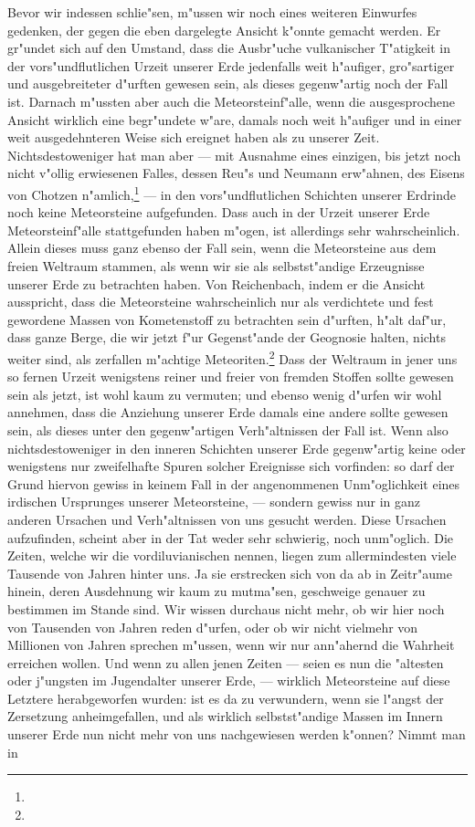 \documentclass[a4paper, 8pt, oneside, polutonikogreek, german]{article}
\begin{document}
Bevor wir indessen schlie"sen, m"ussen wir noch eines weiteren Einwurfes gedenken, der gegen die eben dargelegte Ansicht k"onnte gemacht werden. Er gr"undet sich auf den Umstand, dass die Ausbr"uche vulkanischer T"atigkeit in der vors"undflutlichen Urzeit unserer Erde jedenfalls weit h"aufiger, gro"sartiger und ausgebreiteter d"urften gewesen sein, als dieses gegenw"artig noch der Fall ist. Darnach m"ussten aber auch die Meteorsteinf"alle, wenn die ausgesprochene Ansicht wirklich eine begr"undete w"are, damals noch weit h"aufiger und in einer weit ausgedehnteren Weise sich ereignet haben als zu unserer Zeit. Nichtsdestoweniger hat man aber --- mit Ausnahme eines einzigen, bis jetzt noch nicht v"ollig erwiesenen Falles, dessen Reu"s und Neumann erw"ahnen, des Eisens von Chotzen n"amlich,\footnote{} --- in den vors"undflutlichen Schichten unserer Erdrinde noch keine Meteorsteine aufgefunden. Dass auch in der Urzeit unserer Erde Meteorsteinf"alle stattgefunden haben m"ogen, ist allerdings sehr wahrscheinlich. Allein dieses muss ganz ebenso der Fall sein, wenn die Meteorsteine aus dem freien Weltraum stammen, als wenn wir sie als selbstst"andige Erzeugnisse unserer Erde zu betrachten haben. Von Reichenbach, indem er die Ansicht ausspricht, dass die Meteorsteine wahrscheinlich nur als verdichtete und fest gewordene Massen von Kometenstoff zu betrachten sein d"urften, h"alt daf"ur, dass ganze Berge, die wir jetzt f"ur Gegenst"ande der Geognosie halten, nichts weiter sind, als zerfallen m"achtige Meteoriten.\footnote{} Dass der Weltraum in jener uns so fernen Urzeit wenigstens reiner und freier von fremden Stoffen sollte gewesen sein als jetzt, ist wohl kaum zu vermuten; und ebenso wenig d"urfen wir wohl annehmen, dass die Anziehung unserer Erde damals eine andere sollte gewesen sein, als dieses unter den gegenw"artigen Verh"altnissen der Fall ist. Wenn also nichtsdestoweniger in den inneren Schichten unserer Erde gegenw"artig keine oder wenigstens nur zweifelhafte Spuren solcher Ereignisse sich vorfinden: so darf der Grund hiervon gewiss in keinem Fall in der angenommenen Unm"oglichkeit eines irdischen Ursprunges unserer Meteorsteine, --- sondern gewiss nur in ganz anderen Ursachen und Verh"altnissen von uns gesucht werden. Diese Ursachen aufzufinden, scheint aber in der Tat weder sehr schwierig, noch unm"oglich. Die Zeiten, welche wir die vordiluvianischen nennen, liegen zum allermindesten viele Tausende von Jahren hinter uns. Ja sie erstrecken sich von da ab in Zeitr"aume hinein, deren Ausdehnung wir kaum zu mutma"sen, geschweige genauer zu bestimmen im Stande sind. Wir wissen durchaus nicht mehr, ob wir hier noch von Tausenden von Jahren reden d"urfen, oder ob wir nicht vielmehr von Millionen von Jahren sprechen m"ussen, wenn wir nur ann"ahernd die Wahrheit erreichen wollen. Und wenn zu allen jenen Zeiten --- seien es nun die "altesten oder j"ungsten im Jugendalter unserer Erde, --- wirklich Meteorsteine auf diese Letztere herabgeworfen wurden: ist es da zu verwundern, wenn sie l"angst der Zersetzung anheimgefallen, und als wirklich selbstst"andige Massen im Innern unserer Erde nun nicht mehr von uns nachgewiesen werden k"onnen? Nimmt man in 
\end{document}
